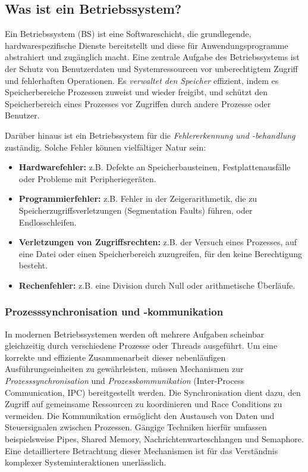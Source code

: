 \subsection{Was ist ein Betriebssystem?}

Ein Betriebssystem (BS) ist eine Softwareschicht, die grundlegende,
hardwarespezifische Dienste bereitstellt und diese für Anwendungsprogramme
abstrahiert und zugänglich macht. Eine zentrale Aufgabe des Betriebssystems ist
der Schutz von Benutzerdaten und Systemressourcen vor unberechtigtem Zugriff
und fehlerhaften Operationen. Es \textit{verwaltet den Speicher} effizient,
indem es Speicherbereiche Prozessen zuweist und wieder freigibt, und schützt
den Speicherbereich eines Prozesses vor Zugriffen durch andere Prozesse oder
Benutzer.

Darüber hinaus ist ein Betriebssystem für die \textit{Fehlererkennung und
    -behandlung} zuständig. Solche Fehler können vielfältiger Natur sein:
\begin{itemize}
    \item \textbf{Hardwarefehler:} z.B. Defekte an Speicherbausteinen, Festplattenausfälle oder Probleme mit Peripheriegeräten.
    \item \textbf{Programmierfehler:} z.B. Fehler in der Zeigerarithmetik, die zu Speicherzugriffsverletzungen (Segmentation Faults) führen, oder Endlosschleifen.
    \item \textbf{Verletzungen von Zugriffsrechten:} z.B. der Versuch eines Prozesses, auf eine Datei oder einen Speicherbereich zuzugreifen, für den keine Berechtigung besteht.
    \item \textbf{Rechenfehler:} z.B. eine Division durch Null oder arithmetische Überläufe.
\end{itemize}

\subsubsection{Prozesssynchronisation und -kommunikation}

In modernen Betriebssystemen werden oft mehrere Aufgaben scheinbar gleichzeitig
durch verschiedene Prozesse oder Threads ausgeführt. Um eine korrekte und
effiziente Zusammenarbeit dieser nebenläufigen Ausführungseinheiten zu
gewährleisten, müssen Mechanismen zur \textit{Prozesssynchronisation} und
\textit{Prozesskommunikation} (Inter-Process Communication, IPC) bereitgestellt
werden. Die Synchronisation dient dazu, den Zugriff auf gemeinsame Ressourcen
zu koordinieren und Race Conditions zu vermeiden. Die Kommunikation ermöglicht
den Austausch von Daten und Steuersignalen zwischen Prozessen. Gängige
Techniken hierfür umfassen beispielsweise Pipes, Shared Memory,
Nachrichtenwarteschlangen und Semaphore. Eine detailliertere Betrachtung dieser
Mechanismen ist für das Verständnis komplexer Systeminteraktionen unerlässlich.

